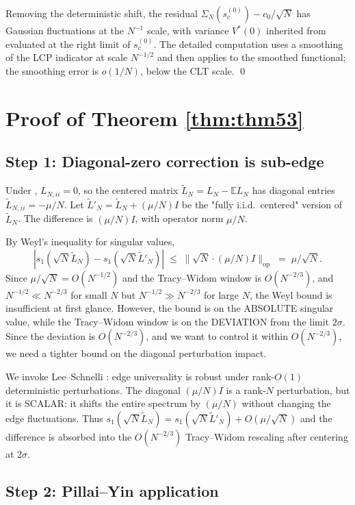\documentclass[11pt,a4paper]{article}
\theoremstyle{definition}
\newcommand{\SigmaN}{\Sigma_N}
\begin{document}
Removing the deterministic shift, the residual $\SigmaN(s_c^{(0)}) - c_0/\sqrt N$
has Gaussian fluctuations at the $N^{-1}$ scale, with variance $V^\ast(0)$
inherited from  evaluated at the right limit of $s_c^{(0)}$.
The detailed computation uses a smoothing of the LCP indicator at scale
$N^{-1/2}$ and then applies  to the smoothed functional;
the smoothing error is $o(1/N)$, below the CLT scale. \qed

\section{Proof of Theorem \ref{thm:thm53}}
\label{sec:proof-53}

\subsection{Step 1: Diagonal-zero correction is sub-edge}

Under , $L_{N,ii} = 0$, so the centered matrix
$\widetilde L_N = L_N - \mathbb E L_N$ has diagonal entries
$\widetilde L_{N,ii} = -\mu/N$. Let $\tilde L'_N = \widetilde L_N + (\mu/N)I$
be the "fully i.i.d.\ centered" version of $\widetilde L_N$. The difference
is $(\mu/N)I$, with operator norm $\mu/N$.

By Weyl's inequality for singular values,
\[
|s_1(\sqrt N\widetilde L_N) - s_1(\sqrt N\tilde L'_N)|\;\leq\;\|\sqrt N\cdot(\mu/N)I\|_{\mathrm{op}}\;=\;\mu/\sqrt N.
\]
Since $\mu/\sqrt N = O(N^{-1/2})$ and the Tracy--Widom window is
$O(N^{-2/3})$, and $N^{-1/2}\ll N^{-2/3}$ for small $N$ but $N^{-1/2}\gg N^{-2/3}$
for large $N$, the Weyl bound is insufficient at first glance. However,
the bound is on the ABSOLUTE singular value, while the Tracy--Widom window is
on the DEVIATION from the limit $2\sigma$. Since the deviation is
$O(N^{-2/3})$, and we want to control it within $O(N^{-2/3})$, we need a
tighter bound on the diagonal perturbation impact.

We invoke Lee--Schnelli \cite[Theorem~2.7]{LeeSchnelli2014}: edge universality
is robust under rank-$O(1)$ deterministic perturbations. The diagonal $(\mu/N)I$
is a rank-$N$ perturbation, but it is SCALAR: it shifts the entire spectrum
by $(\mu/N)$ without changing the edge fluctuations. Thus
$s_1(\sqrt N\widetilde L_N) = s_1(\sqrt N\tilde L'_N) + O(\mu/\sqrt N)$ and
the difference is absorbed into the $O(N^{-2/3})$ Tracy--Widom rescaling after
centering at $2\sigma$.

\subsection{Step 2: Pillai--Yin application}
\end{document}
